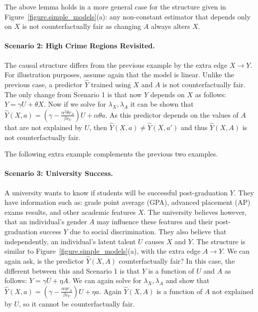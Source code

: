 The above lemma holds in a more general case for the structure given
in Figure~\ref{figure.simple_models}(a): any non-constant
estimator that depends only on $X$ is not counterfactually fair as
changing $A$ always alters $X$.

\paragraph{Scenario 2: High Crime Regions Revisited.}

The causal structure differs from the previous example by the extra
edge $X \rightarrow Y$. For illustration purposes, assume again that
the model is linear. Unlike the previous case, a predictor $\hat Y$
trained using $X$ and $A$ is not counterfactually fair. The only
change from Scenario 1 is that now $Y$ depends on $X$ as follows: $Y
\!=\! \gamma U + \theta X$. Now if we solve for $\lambda_X,\lambda_A$
it can be shown that $\hat Y(X,a) \!=\! (\gamma - \frac{\alpha^2
  \theta v_A}{\beta v_U})U + \alpha \theta a$. As this predictor
depends on the values of $A$ that are not explained by $U$, then
$\hat Y(X,a) \!\neq\! \hat Y(X,a')$ and thus $\hat Y(X,A)$ is not
counterfactually fair.

The following extra example complements the previous two examples.

\paragraph{Scenario 3: University Success.}
A university wants to know if students will be successful
post-graduation $Y$. They have information such as: grade point
average (GPA), advanced placement (AP) exams results, and other
academic features $X$. The university believes however, that an
individual's gender $A$ may influence these features and their
post-graduation success $Y$ due to social discrimination. They also
believe that independently, an individual's latent talent $U$ causes
$X$ and $Y$. The structure is similar to
Figure~\ref{figure.simple_models}(a), with the extra
edge $A \rightarrow Y$. We can again ask, is the predictor $\hat
Y(X,A)$ counterfactually fair? In this case, the different between
this and Scenario 1 is that $Y$ is a function of $U$ and $A$ as
follows: $Y \!=\! \gamma U + \eta A$. We can again solve for
$\lambda_X,\lambda_A$ and show that $\hat Y(X,a) \!=\! (\gamma -
\frac{\alpha \eta v_A}{\beta v_U})U + \eta a$. Again $\hat Y(X,A)$ is
a function of $A$ not explained by $U$, so it cannot be counterfactually fair.

